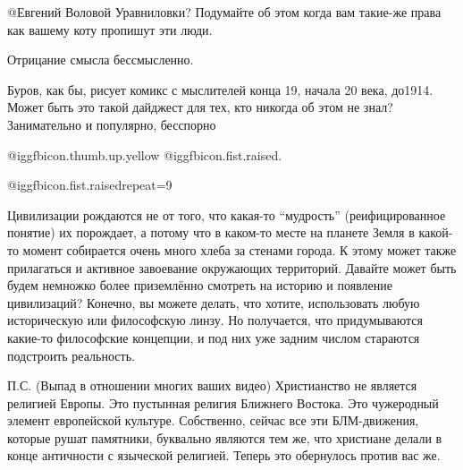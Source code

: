 \begin{multicols}{2}
\begin{itemize}

 @Евгений Воловой  Уравниловки? Подумайте об этом когда вам такие-же права как
вашему коту пропишут эти люди.
\end{itemize} %

Отрицание смысла бессмысленно.


Буров, как бы, рисует комикс с мыслителей конца 19, начала 20 века, до1914. Может
быть это такой дайджест для тех, кто никогда об этом не знал? Занимательно и
популярно, бесспорно

 @igg{fbicon.thumb.up.yellow}  @igg{fbicon.fist.raised}.

\begin{itemize} %
 @igg{fbicon.fist.raised}{repeat=9}
\end{itemize} %


Цивилизации рождаются не от того, что какая-то \enquote{мудрость} (реифицированное
понятие) их порождает, а потому что в каком-то месте на планете Земля в
какой-то момент собирается очень много хлеба за стенами города. К этому может
также прилагаться и активное завоевание окружающих территорий. Давайте может
быть будем немножко более приземлённо смотреть на историю и появление
цивилизаций? Конечно, вы можете делать, что хотите, использовать любую
историческую или философскую линзу. Но получается, что придумываются какие-то
философские концепции, и под них уже задним числом стараются подстроить
реальность.

\begin{itemize} %

П.С. (Выпад в отношении многих ваших видео) Христианство не является религией
Европы. Это пустынная религия Ближнего Востока. Это чужеродный элемент
европейской культуре. Собственно, сейчас все эти БЛМ-движения, которые рушат
памятники, буквально являются тем же, что христиане делали в конце античности с
языческой религией. Теперь это обернулось против вас же.


\end{itemize}
\end{multicols}

